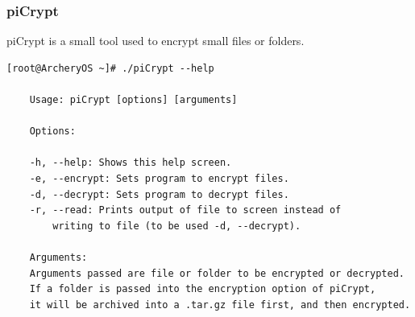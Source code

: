 \documentclass{article}
\begin{document}
\subsubsection{piCrypt}
piCrypt is a small tool used to encrypt small files or folders.
\begin{lstlisting}
[root@ArcheryOS ~]# ./piCrypt --help

	Usage: piCrypt [options] [arguments]

	Options:

	-h, --help: Shows this help screen.
	-e, --encrypt: Sets program to encrypt files.
	-d, --decrypt: Sets program to decrypt files.
	-r, --read: Prints output of file to screen instead of
		writing to file (to be used -d, --decrypt).

	Arguments:
	Arguments passed are file or folder to be encrypted or decrypted.
	If a folder is passed into the encryption option of piCrypt,
	it will be archived into a .tar.gz file first, and then encrypted.
\end{lstlisting}
\end{document}
